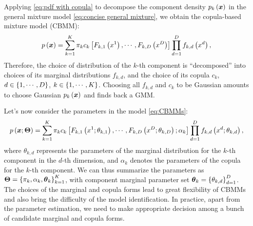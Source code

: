 Applying \eqref{eq:pdf with copula} to decompose the component density $p_k\left(\boldsymbol{x}\right)$ in the general mixture model \eqref{eq:concise general mixture}, we obtain the copula-based mixture model (CBMM):
\begin{equation}
    \label{eq:CBMMs}
    p\left(\boldsymbol{x}\right) = \sum_{k=1}^K  \pi_k c_k\left[F_{k,1}\left(x^1\right),\cdots,F_{k,D}\left(x^D\right)\right]\prod_{d=1}^D f_{k,d}\left(x^d\right),
\end{equation}
Therefore, the choice of 
distribution of the $k$-th component
is ``decomposed'' 
into
choices of its marginal distributions $f_{k,d}$, and the choice of its copula $c_k$, $d\in\left\{1,\cdots,D\right\}$, $k\in\left\{1,\cdots,K\right\}$. Choosing all $f_{k,d}$ and $c_k$ to be Gaussian 
amounts to choose
Gaussian $p_k\left(\boldsymbol{x}\right)$ and finds back a GMM. 

Let's now
consider the parameters in the model \eqref{eq:CBMMs}:
\begin{equation}
    \label{eq:CBMMs with params}
    p\left(\boldsymbol{x};\boldsymbol{\Theta}\right) = \sum_{k=1}^K  \pi_k c_k\left[F_{k,1}\left(x^1;\theta_{k,1}\right),\cdots,F_{k,D}\left(x^D;\theta_{k,D}\right); \alpha_k\right] \prod_{d=1}^D f_{k,d}\left(x^d;\theta_{k,d}\right),
\end{equation}
where 
$\theta_{k,d}$ represents the parameters of the marginal distribution 
for the $k$-th component in the $d$-th dimension, 
and 
$\alpha_k$ denotes the parameters of the copula 
for the $k$-th 
component. We can thus summarize the parameters as $\boldsymbol{\Theta} = \left\{\pi_k, \alpha_k, \boldsymbol{\theta}_k\right\}_{k=1}^K$, with component marginal parameter set $\boldsymbol{\theta}_k=\left\{\theta_{k,d}\right\}_{d=1}^{D}$.
The choices of the marginal and copula forms lead to great flexibility of CBMMs and also bring the difficulty of the model identification. 
In practice, apart from the parameter estimation, we need to make appropriate decision among a bunch of candidate marginal and copula forms.



